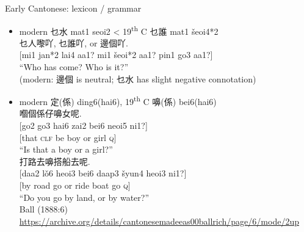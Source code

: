 \documentclass{beamer}
\begin{document}
\begin{frame}[fragile]{Early Cantonese: lexicon / grammar}

\begin{itemize}
    \item modern 乜水 mat1 seoi2 < 19\textsuperscript{th} C 乜誰 mat1 šeoi4*2\\
    \smallskip
    {\footnotesize 乜人嚟吖, 乜誰吖, or 邊個吖.\\
    {[mi1 jan*2 lai4 aa1? mi1 šeoi*2 aa1? pin1 go3 aa1?]}\\
    \enquote{Who has come? Who is it?}}\\
    (modern: 邊個 is neutral; 乜水 has slight negative connotation)
    \item modern 定(係) ding6(hai6), 19\textsuperscript{th} C 嚊(係) bei6(hai6)\\ 
    {\footnotesize 嗰個係仔嚊女呢.\\
    {[go2 go3 hai6 zai2 bei6 neoi5 ni1?]}\\
    {[that \textsc{clf} be boy or girl \textsc{q}]}\\
    \enquote{Is that a boy or a girl?}}\\
    {\footnotesize 打路去嚊搭船去呢.\\
    {[daa2 lǒ6 heoi3 bei6 daap3 šyun4 heoi3 ni1?]}\\
    {[by road go or ride boat go \textsc{q}]}\\
    \enquote{Do you go by land, or by water?}}\\
	{\tiny Ball (1888:6) \url{https://archive.org/details/cantonesemadeeas00ballrich/page/6/mode/2up}}
\end{itemize}

\end{frame}
\end{document}
